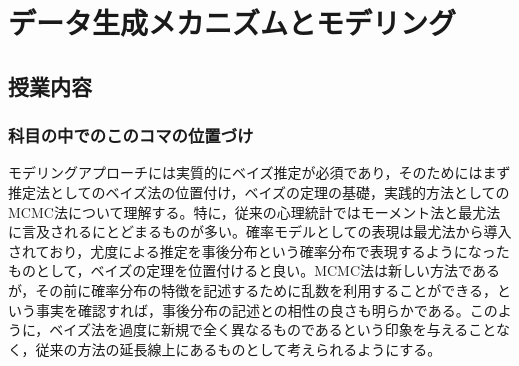 \section{データ生成メカニズムとモデリング}
\subsection{授業内容}
\subsubsection{科目の中でのこのコマの位置づけ}
モデリングアプローチには実質的にベイズ推定が必須であり，そのためにはまず推定法としてのベイズ法の位置付け，ベイズの定理の基礎，実践的方法としてのMCMC法について理解する。特に，従来の心理統計ではモーメント法と最尤法に言及されるにとどまるものが多い。確率モデルとしての表現は最尤法から導入されており，尤度による推定を事後分布という確率分布で表現するようになったものとして，ベイズの定理を位置付けると良い。MCMC法は新しい方法であるが，その前に確率分布の特徴を記述するために乱数を利用することができる，という事実を確認すれば，事後分布の記述との相性の良さも明らかである。このように，ベイズ法を過度に新規で全く異なるものであるという印象を与えることなく，従来の方法の延長線上にあるものとして考えられるようにする。

